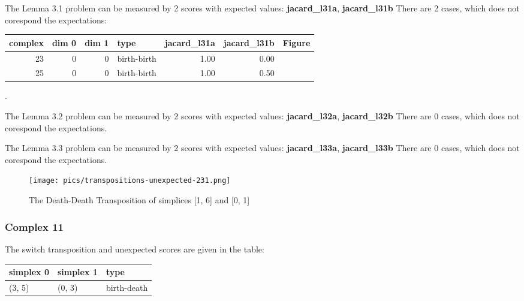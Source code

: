 \documentclass{article}
\begin{document}
    \par The Lemma 3.1 problem can be measured by 2 scores with expected 
    values: \textbf{jacard\_l31a}, \textbf{jacard\_l31b}
    There are 2 cases, which does not corespond the expectations: 
\begin{center}
\begin{tabular}{rrrlrrl}
\toprule
complex & dim 0 & dim 1 & type & jacard\_l31a & jacard\_l31b & Figure \\
\midrule
23 & 0 & 0 & birth-birth & 1.00 & 0.00 &  \\
25 & 0 & 0 & birth-birth & 1.00 & 0.50 &  \\
\bottomrule
\end{tabular}
\end{center}.
    
    \par The Lemma 3.2 problem can be measured by 2 scores with expected 
    values: \textbf{jacard\_l32a}, \textbf{jacard\_l32b}
    There are 0 cases, which does not corespond the expectations. 
    
    \par The Lemma 3.3 problem can be measured by 2 scores with expected 
    values: \textbf{jacard\_l33a}, \textbf{jacard\_l33b}
    There are 0 cases, which does not corespond the expectations. 
    
    \begin{figure}[ht]
    \centering
    \texttt{[image: pics/transpositions-unexpected-231.png]}
    \caption{The Death-Death Transposition of simplices [1, 6] and [0, 1]}
    \label{fig:unexpected231}
    \end{figure}
    

    \subsubsection{Complex 11}
    \par The switch transposition and unexpected scores are given in the table:
    \begin{center}
\begin{tabular}{lll}
\toprule
simplex 0 & simplex 1 & type \\
\midrule
(3, 5) & (0, 3) & birth-death \\
\bottomrule
\end{tabular}
\end{center}
    
    
\end{document}
